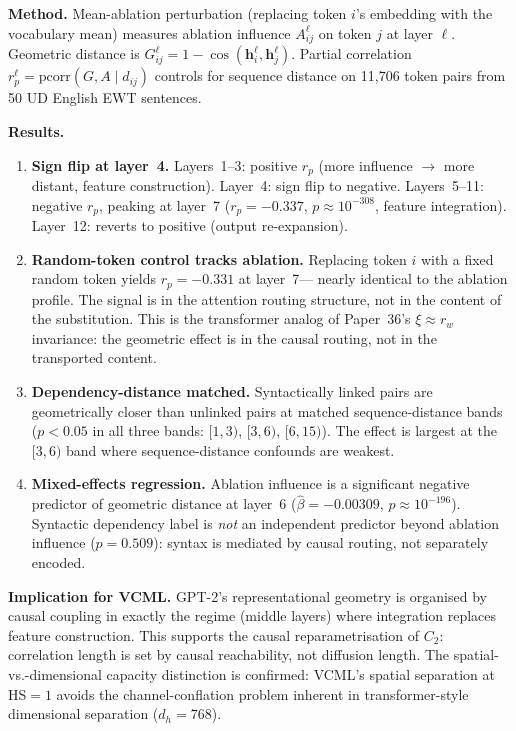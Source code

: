 \documentclass[11pt]{article}
\begin{document}
\textbf{Method.}
Mean-ablation perturbation (replacing token $i$'s embedding with the vocabulary mean)
measures ablation influence $A_{ij}^\ell$ on token $j$ at layer $\ell$.
Geometric distance is $G_{ij}^\ell = 1 - \cos(\mathbf{h}_i^\ell, \mathbf{h}_j^\ell)$.
Partial correlation $r_p^\ell = \mathrm{pcorr}(G, A \mid d_{ij})$ controls for sequence
distance on 11{,}706 token pairs from 50 UD English EWT sentences.

\textbf{Results.}
\begin{enumerate}
  \item \textbf{Sign flip at layer~4.}
    Layers~1--3: positive $r_p$ (more influence $\to$ more distant, feature construction).
    Layer~4: sign flip to negative.
    Layers~5--11: negative $r_p$, peaking at layer~7
    ($r_p = -0.337$, $p \approx 10^{-308}$, feature integration).
    Layer~12: reverts to positive (output re-expansion).

  \item \textbf{Random-token control tracks ablation.}
    Replacing token $i$ with a fixed random token yields $r_p = -0.331$ at layer~7---
    nearly identical to the ablation profile.
    The signal is in the attention routing structure, not in the content of the substitution.
    This is the transformer analog of Paper~36's $\xi \approx r_w$ invariance: the
    geometric effect is in the causal routing, not in the transported content.

  \item \textbf{Dependency-distance matched.}
    Syntactically linked pairs are geometrically closer than unlinked pairs at matched
    sequence-distance bands ($p < 0.05$ in all three bands: $[1,3)$, $[3,6)$, $[6,15)$).
    The effect is largest at the $[3,6)$ band where sequence-distance confounds are weakest.

  \item \textbf{Mixed-effects regression.}
    Ablation influence is a significant negative predictor of geometric distance at layer~6
    ($\hat{\beta} = -0.00309$, $p \approx 10^{-196}$).
    Syntactic dependency label is \emph{not} an independent predictor beyond ablation
    influence ($p = 0.509$): syntax is mediated by causal routing, not separately encoded.
\end{enumerate}

\textbf{Implication for VCML.}
GPT-2's representational geometry is organised by causal coupling in exactly the regime
(middle layers) where integration replaces feature construction.
This supports the causal reparametrisation of $C_2$: correlation length is set by causal
reachability, not diffusion length.
The spatial-vs.-dimensional capacity distinction is confirmed: VCML's spatial separation
at HS$=1$ avoids the channel-conflation problem inherent in transformer-style dimensional
separation ($d_h = 768$).
\end{document}
